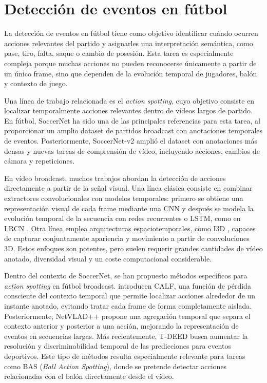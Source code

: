 \section{Detección de eventos en fútbol}

La detección de eventos en fútbol tiene como objetivo identificar cuándo ocurren acciones relevantes del partido y asignarles una interpretación semántica, como pase, tiro, falta, saque o cambio de posesión. Esta tarea es especialmente compleja porque muchas acciones no pueden reconocerse únicamente a partir de un único frame, sino que dependen de la evolución temporal de jugadores, balón y contexto de juego.

Una línea de trabajo relacionada es el \textit{action spotting}, cuyo objetivo consiste en localizar temporalmente acciones relevantes dentro de vídeos largos de partido. En fútbol, SoccerNet \citep{GiancolaSoccerNet2018} ha sido una de las principales referencias para esta tarea, al proporcionar un amplio dataset de partidos broadcast con anotaciones temporales de eventos. Posteriormente, SoccerNet-v2 \citep{DeliegeSoccerNetV22021} amplió el dataset con anotaciones más densas y nuevas tareas de comprensión de vídeo, incluyendo acciones, cambios de cámara y repeticiones.

En vídeo broadcast, muchos trabajos abordan la detección de acciones directamente a partir de la señal visual. Una línea clásica consiste en combinar extractores convolucionales con modelos temporales: primero se obtiene una representación visual de cada frame mediante una CNN y después se modela la evolución temporal de la secuencia con redes recurrentes o LSTM, como en LRCN \citep{DonahueLRCN2015}. Otra línea emplea arquitecturas espaciotemporales, como I3D \citep{CarreiraI3D2017}, capaces de capturar conjuntamente apariencia y movimiento a partir de convoluciones 3D. Estos enfoques son potentes, pero suelen requerir grandes cantidades de vídeo anotado, diversidad visual y un coste computacional considerable.

Dentro del contexto de SoccerNet, se han propuesto métodos específicos para \textit{action spotting} en fútbol broadcast. \citet{CioppaCALF2020} introducen CALF, una función de pérdida consciente del contexto temporal que permite localizar acciones alrededor de un instante anotado, evitando tratar cada frame de forma completamente aislada. Posteriormente, NetVLAD++ \citep{GiancolaNetVLAD2021} propone una agregación temporal que separa el contexto anterior y posterior a una acción, mejorando la representación de eventos en secuencias largas. Más recientemente, T-DEED \citep{XarlesTDEED2024} busca aumentar la resolución y discriminabilidad temporal de las predicciones para eventos deportivos. Este tipo de métodos resulta especialmente relevante para tareas como BAS (\textit{Ball Action Spotting}), donde se pretende detectar acciones relacionadas con el balón directamente desde el vídeo.


